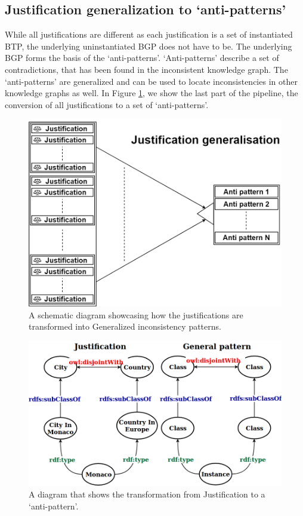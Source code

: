 \documentclass[11pt,letterpaper ,oneside ]{book}
\begin{document}
	\subsection{Justification generalization to `anti-patterns'}
	While all justifications are different as each justification is a set of instantiated BTP, the underlying uninstantiated BGP does not have to be. The underlying BGP forms the basis of the `anti-patterns'. `Anti-patterns' describe a set of contradictions, that has been found in the inconsistent knowledge graph. The `anti-patterns' are generalized and can be used to locate inconsistencies in other knowledge graphs as well. In Figure \ref{fig:PatternGeneralizing}, we show the last part of the pipeline, the conversion of all justifications to a set of `anti-patterns'.
	
	\begin{figure}
		\centering
		\includegraphics[width=\linewidth]{images/PatternGeneralizing.png}
		\caption{A schematic diagram showcasing how the justifications are transformed into Generalized inconsistency patterns.}
		\label{fig:PatternGeneralizing}
	\end{figure}
	\begin{figure}
		\centering
		\includegraphics[width=\linewidth]{images/JustificationtoGeneral.png}
		\caption{A diagram that shows the transformation from Justification to a `anti-pattern'.}
		\label{fig:JustificationtoGeneral}
	\end{figure}
	
\end{document}

